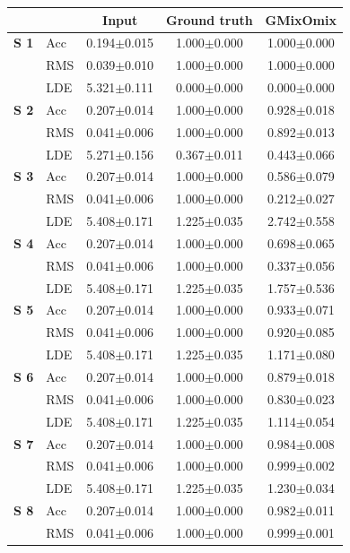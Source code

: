 \begin{tabular}{llccc}
\hline
 & & Input & Ground truth & GMixOmix \\
\hline
\textbf{S 1} & Acc & 0.194$\pm$0.015 & 1.000$\pm$0.000 & 1.000$\pm$0.000 \\
 & RMS & 0.039$\pm$0.010 & 1.000$\pm$0.000 & 1.000$\pm$0.000 \\
 & LDE & 5.321$\pm$0.111 & 0.000$\pm$0.000 & 0.000$\pm$0.000 \\
\hline
\textbf{S 2} & Acc & 0.207$\pm$0.014 & 1.000$\pm$0.000 & 0.928$\pm$0.018 \\
 & RMS & 0.041$\pm$0.006 & 1.000$\pm$0.000 & 0.892$\pm$0.013 \\
 & LDE & 5.271$\pm$0.156 & 0.367$\pm$0.011 & 0.443$\pm$0.066 \\
\hline
\textbf{S 3} & Acc & 0.207$\pm$0.014 & 1.000$\pm$0.000 & 0.586$\pm$0.079 \\
 & RMS & 0.041$\pm$0.006 & 1.000$\pm$0.000 & 0.212$\pm$0.027 \\
 & LDE & 5.408$\pm$0.171 & 1.225$\pm$0.035 & 2.742$\pm$0.558 \\
\hline
\textbf{S 4} & Acc & 0.207$\pm$0.014 & 1.000$\pm$0.000 & 0.698$\pm$0.065 \\
 & RMS & 0.041$\pm$0.006 & 1.000$\pm$0.000 & 0.337$\pm$0.056 \\
 & LDE & 5.408$\pm$0.171 & 1.225$\pm$0.035 & 1.757$\pm$0.536 \\
\hline
\textbf{S 5} & Acc & 0.207$\pm$0.014 & 1.000$\pm$0.000 & 0.933$\pm$0.071 \\
 & RMS & 0.041$\pm$0.006 & 1.000$\pm$0.000 & 0.920$\pm$0.085 \\
 & LDE & 5.408$\pm$0.171 & 1.225$\pm$0.035 & 1.171$\pm$0.080 \\
\hline
\textbf{S 6} & Acc & 0.207$\pm$0.014 & 1.000$\pm$0.000 & 0.879$\pm$0.018 \\
 & RMS & 0.041$\pm$0.006 & 1.000$\pm$0.000 & 0.830$\pm$0.023 \\
 & LDE & 5.408$\pm$0.171 & 1.225$\pm$0.035 & 1.114$\pm$0.054 \\
\hline
\textbf{S 7} & Acc & 0.207$\pm$0.014 & 1.000$\pm$0.000 & 0.984$\pm$0.008 \\
 & RMS & 0.041$\pm$0.006 & 1.000$\pm$0.000 & 0.999$\pm$0.002 \\
 & LDE & 5.408$\pm$0.171 & 1.225$\pm$0.035 & 1.230$\pm$0.034 \\
\hline
\textbf{S 8} & Acc & 0.207$\pm$0.014 & 1.000$\pm$0.000 & 0.982$\pm$0.011 \\
 & RMS & 0.041$\pm$0.006 & 1.000$\pm$0.000 & 0.999$\pm$0.001 \\

\end{tabular}
